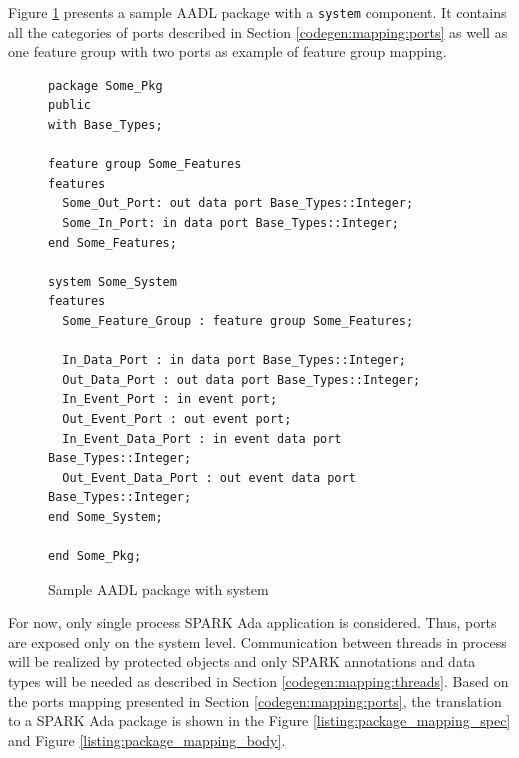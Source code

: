 Figure \ref{listing:aadl_sample} presents a sample AADL package with a \lstinline{system} component. It contains all the categories of ports described in Section \ref{codegen:mapping:ports} as well as one feature group with two ports as example of feature group mapping.

\begin{figure}[ht]
\singlespacing
\begin{lstlisting}[language=aadl, frame=single, gobble=0]
package Some_Pkg
public
with Base_Types;

feature group Some_Features
features
  Some_Out_Port: out data port Base_Types::Integer;
  Some_In_Port: in data port Base_Types::Integer;
end Some_Features;

system Some_System
features
  Some_Feature_Group : feature group Some_Features;
  
  In_Data_Port : in data port Base_Types::Integer;
  Out_Data_Port : out data port Base_Types::Integer;
  In_Event_Port : in event port;
  Out_Event_Port : out event port;
  In_Event_Data_Port : in event data port Base_Types::Integer;
  Out_Event_Data_Port : out event data port Base_Types::Integer;
end Some_System;

end Some_Pkg;
\end{lstlisting}
\doublespacing
\caption{Sample AADL package with system}
\label{listing:aadl_sample}
\end{figure}

For now, only single process SPARK Ada application is considered. Thus, ports are exposed only on the system level. Communication between threads in process will be realized by protected objects and only SPARK annotations and data types will be needed as described in Section \ref{codegen:mapping:threads}. Based on the ports mapping presented in Section \ref{codegen:mapping:ports}, the translation to a SPARK Ada package is shown in the Figure \ref{listing:package_mapping_spec} and Figure \ref{listing:package_mapping_body}. 

